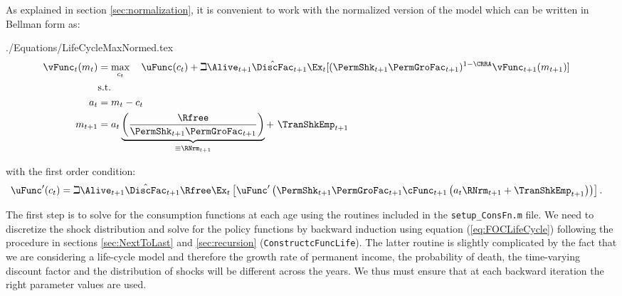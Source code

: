 \documentclass[titlepage, headings=optiontotocandhead]{\econtex}
\begin{document}
As explained in section \ref{sec:normalization}, it is convenient to work with the normalized version of the model which can be written in Bellman form as:
\begin{verbatimwrite}{./Equations/LifeCycleMaxNormed.tex}
  \begin{equation*}\begin{gathered}\begin{aligned}
        {\vFunc}_{t}({m}_{t})  & = \max_{{c}_{t}}~~~ \uFunc({c}_{t})+\beth\Alive_{t+1}\byage{\DiscFac}_{t+1}
          \Ex_{t}[(\PermShk_{t+1}\PermGroFac_{t+1})^{1-\CRRA}{\vFunc}_{t+1}({m}_{t+1})]   \\
        & \text{s.t.} &   \nonumber \\
        {a}_{t}    & = {m}_{t}-{c}_{t} \nonumber
        \\      {m}_{t+1}  & = {a}_{t}\underbrace{\left(\frac{\Rfree}{\PermShk_{t+1}\PermGroFac_{t+1}}\right)}_{\equiv \RNrm_{t+1}}+ ~\TranShkEmp_{t+1}
      \end{aligned}\end{gathered}\end{equation*}
\end{verbatimwrite}
\unskip
with the first order condition:
\begin{equation}\begin{gathered}\begin{aligned}
      \uFunc^{\prime}({c}_{t}) & = \beth\Alive_{t+1}\byage{\DiscFac}_{t+1}\Rfree \Ex_{t}\left[\uFunc^{\prime}\left(\PermShk_{t+1}\PermGroFac_{t+1}\cFunc_{t+1}\left({a}_{t}\RNrm_{t+1}+\TranShkEmp_{t+1}\right)\right)\right]\label{eq:FOCLifeCycle}
      .
    \end{aligned}\end{gathered}\end{equation}

The first step is to solve for the consumption functions at each age
using the routines included in the \texttt{setup\_ConsFn.m} file. We
need to discretize the shock distribution and solve for the policy
functions by backward induction using equation (\ref{eq:FOCLifeCycle})
following the procedure in sections \ref{sec:NextToLast} and
\ref{sec:recursion} (\texttt{ConstructcFuncLife}). The latter routine
is slightly complicated by the fact that we are considering a
life-cycle model and therefore the growth rate of permanent income,
the probability of death, the time-varying discount factor and the
distribution of shocks will be different across the years. We thus
must ensure that at each backward iteration the right parameter
values are used.
\end{document}
